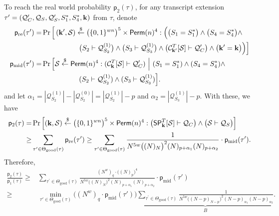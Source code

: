 To reach the real world probability $\mathsf{p}_2(\tau)$, for any transcript extension $\tau'=(\mathcal{Q}_{C}',\mathcal{Q}_{S},\mathcal{Q}_{S}',S_1^*,S_4^*,\mathbf{k})$ from $\tau$, denote
%
%
\begin{align}
\mathsf{p}_{\mathrm{re}}(\tau') = & \operatorname{Pr}\Big[\left(\mathbf{k}',\mathcal{S}\right) \stackrel{\$}{\leftarrow} \big(\{0,1\}^{wn}\big)^5 \times \mathsf{Perm}(n)^4:
\Big(\big(S_1=S_1^*\big)\wedge\big(S_4=S_4^*\big)\wedge		\notag 	\\
&\ \ \ \ \ \ \ \ \ \ \ \ \ \ \ \ \big(S_2\vdash\mathcal{Q}_{S_2}^{(1)}\big)\wedge\big(S_3\vdash\mathcal{Q}_{S_3}^{(1)}\big)\wedge\big(\mathcal{C}_{\mathbf{k}'}^T[\mathcal{S}] \vdash \mathcal{Q}_C'\big)\wedge\big(\mathbf{k}'=\mathbf{k}\big)\Big)\Big]	 	\notag 	\\
\mathsf{p}_{\mathrm{mid}}(\tau') = & \operatorname{Pr}\Big[\mathcal{S} \stackrel{\$}{\leftarrow}\mathsf{Perm}(n)^4:(\mathcal{C}_{\mathbf{k}}^T[\mathcal{S}] \vdash \mathcal{Q}_C')~\Big|~
(S_1=S_1^*)\wedge (S_4=S_4^*)\wedge	 	\notag 	\\
&\ \ \ \ \ \ \ \ \ \ \ \ \ \ \ \  (S_2\vdash\mathcal{Q}_{S_2}^{(1)})\wedge (S_3\vdash\mathcal{Q}_{S_3}^{(1)})\Big].	 	\notag 	
\end{align}
%
%
%
and let $\alpha_1=|\mathcal{Q}_{S_2}^{(1)}|-|\mathcal{Q}_{S_2}^{(0)}|=|\mathcal{Q}_{S_2}^{(1)}|-p$ and $\alpha_2=|\mathcal{Q}_{S_3}^{(1)}|-p$. With these, we have
%
%
\begin{align*}
\mathsf{p}_2(\tau)=&\operatorname{Pr}\left[\left(\mathbf{k},\mathcal{S}\right) \stackrel{\$}{\leftarrow} \big(\{0,1\}^{wn}\big)^5 \times \mathsf{Perm}(n)^4:\big(\spn_{\bfk}^{T}[\mathcal{S}] \vdash \mathcal{Q}_{C}\big) \wedge \big(\mathcal{S} \vdash \mathcal{Q}_{S}\big)\right]		\\
\geq & \sum_{\tau^{\prime} \in \Theta_{\mathrm{good}}(\tau)} \mathsf{p}_{\mathrm{re}}(\tau')  
\geq
\sum_{\tau^{\prime} \in \Theta_{\mathrm{good}}(\tau)}
%
\frac{1}{N^{5w}\big((N)_{N}\big)^2(N)_{p+\alpha_1}(N)_{p+\alpha_2}}\cdot \mathsf{p}_{\mathrm{mid}}(\tau')  .
\end{align*}
%
%
Therefore,
%
%
\begin{align*}
\frac{\mathsf{p}_{2}(\tau)}{\mathsf{p}_{1}(\tau)}   \geq  &
\sum_{\tau^{\prime} \in \Theta_{\mathrm{good}}(\tau)}
\frac{(N^w)_q\cdot\big((N)_p\big)^4}{N^{5w}\big((N)_{N}\big)^2(N)_{p+\alpha_1}(N)_{p+\alpha_2}}\cdot \mathsf{p}_{\mathrm{mid}}(\tau')         \\
\geq  &    \min_{\tau' \in \Theta_{\mathrm{good}}(\tau)}\big((N^w)_q\cdot\mathsf{p}_{\mathrm{mid}}(\tau')\big)
\underbrace{\sum_{\tau^{\prime} \in \Theta_{\mathrm{good}}(\tau)}
	\frac{1}{N^{5w}\big((N-p)_{N-p}\big)^2(N-p)_{\alpha_1}(N-p)_{\alpha_2}}}_{B} .
\end{align*}




